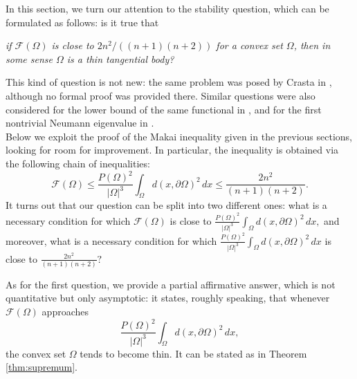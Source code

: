 \documentclass[oneside,a4paper,11pt,notitlepage]{article}
\newcommand{\abs}[1]{{\left|#1\right|}}
\theoremstyle{definition}
\theoremstyle{plain}
\theoremstyle{definition}
\begin{document}
    \label{sec4}

In this section, we turn our attention to the stability question, which can be formulated as follows:
is it true that
\begin{center}
    \emph{
    if $\mathcal{F}(\Omega)$ is close to $2n^2/((n+1)(n+2))$
    for a convex set $\Omega$, then in some sense $\Omega$ is
    a thin tangential body?
    }
\end{center}
This kind of question is not new: the same problem was posed by Crasta in \cite{Cra2004}, although no formal proof was provided there. Similar questions were also considered for the lower bound of the same functional in \cite{AGS,AMPS}, and for the first nontrivial Neumann eigenvalue in \cite{ABF,ABF2}.\\
\noindent Below we exploit the proof of the Makai inequality given in the previous sections, looking for room for improvement. In particular, the inequality is obtained via the following chain of inequalities:
\begin{equation*}
\mathcal{F}(\Omega) \leq \frac{ P(\Omega)^2}{\abs{\Omega}^3}\int_{\Omega}d(x,\partial\Omega)^2\, dx  
\leq \frac{2n^2}{(n+1)(n+2)}.
\end{equation*}
It turns out that our question can be split into two different ones: what is a necessary condition for which 
\(
\mathcal{F}(\Omega)\)
is close to 
\(
\frac{ P(\Omega)^2}{\abs{\Omega}^3}\int_{\Omega}d(x,\partial\Omega)^2\, dx,
\)
and moreover, what is a necessary condition for which 
\(
\frac{ P(\Omega)^2}{\abs{\Omega}^3}\int_{\Omega}d(x,\partial\Omega)^2\, dx
\)
is close to 
\(
\frac{2n^2}{(n+1)(n+2)}?
\)

As for the first question, we provide a partial affirmative answer, which is not quantitative but only asymptotic: it states, roughly speaking, that whenever 
\(\mathcal{F}(\Omega)\)
approaches 
\[
\frac{ P(\Omega)^2}{\abs{\Omega}^3}\int_{\Omega}d(x,\partial\Omega)^2\, dx,
\]
the convex set $\Omega$ tends to become thin. It can be stated as in Theorem \ref{thm:supremum}.
\end{document}
